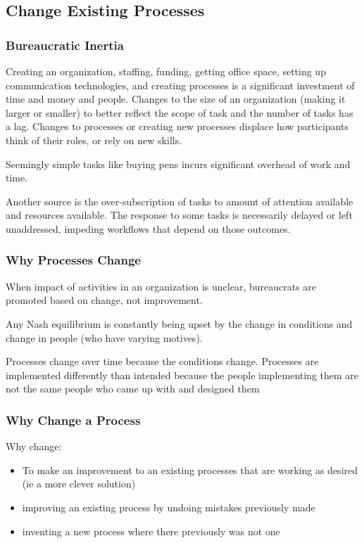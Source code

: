 \subsection{Change Existing Processes\label{sec:change_a_process}}

\subsubsection{Bureaucratic Inertia}

Creating an organization, staffing, funding, getting office space, setting up communication technologies, and creating processes is a significant investment of time and money and people. Changes to the size of an organization (making it larger or smaller) to better reflect the scope of task and the number of tasks has a lag. Changes to processes or creating new processes displace how participants think of their roles, or rely on new skills. 

Seemingly simple tasks like buying pens incurs significant overhead of work and time. 

Another source is the over-subscription of tasks to amount of attention available and resources available. The response to some tasks is necessarily delayed or left unaddressed, impeding workflows that depend on those outcomes. 



\subsubsection{Why Processes Change}


When impact of activities in an organization is unclear, bureaucrats are promoted based on change, not improvement.

Any Nash equilibrium is constantly being upset by the change in conditions and change in people (who have varying motives).

Processes change over time because the conditions change. Processes are implemented differently than intended because the people implementing them are not the same people who came up with and designed them


\subsubsection{Why Change a Process}
Why change:
\begin{itemize}
    \item To make an improvement to an existing processes that are working as desired (ie a more clever solution)
    \item improving an existing process by undoing mistakes previously made
    \item inventing a new process where there previously was not one
\end{itemize}

